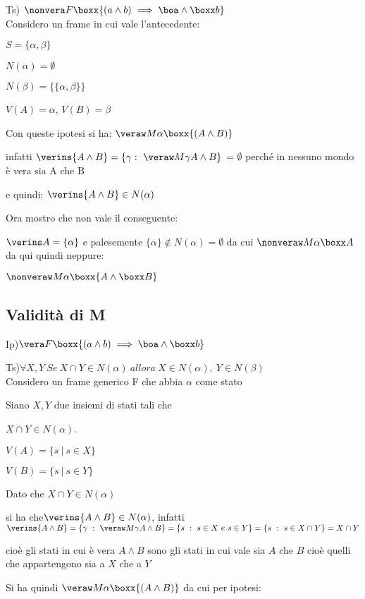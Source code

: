 Ts) $\nonvera F{\boxx{(a\wedge b)\implies\boa\wedge\boxx b}}$\\


Considero un frame in cui vale l'antecedente:

$S=\{\alpha,\beta\}$

$N(\alpha)=\emptyset$

$N(\beta)=\{\{\alpha,\beta\}\}$

$V(A)=\alpha$, $V(B)=\beta$

Con queste ipotesi si ha: $\veraw M{\alpha}{\boxx{(A\wedge B)}}$

infatti $\verins{A\wedge B}=\{\gamma:\ \mbox{\ensuremath{\veraw M{\gamma}{A\wedge B}}\}}$
= $\emptyset$ perché in nessuno mondo è vera sia A che B

e quindi:	$\verins{A\wedge B}\in N(\alpha)$ 

Ora mostro che non vale il conseguente:

$\verins A=\{\alpha\}$ e palesemente $\{\alpha\}\notin N(\alpha)=\emptyset$
da cui $\nonveraw M{\alpha}{\boxx A}$ da qui quindi neppure:

$\nonveraw M{\alpha}{\boxx{A\wedge\boxx B}}$


\subsection{Validità di M}

Ip)$\vera F{\boxx{(a\wedge b)\implies\boa\wedge\boxx b}}$ 

Ts)$\forall X,Y\ Se\ X\cap Y\in N(\alpha)\ allora\ X\in N(\alpha),\ Y\in N(\beta)$	\\
		

Considero un frame generico F che abbia $\alpha$ come stato

Siano $X,Y$ due insiemi di stati tali che

$X\cap Y\in N(\alpha)$. 

$V(A)=\{s\ |\ s\in X\}$

$V(B)=\{s\ |\ s\in Y\}$

Dato che $X\cap Y\in N(\alpha)$

si ha che$\verins{A\wedge B}\in N(\alpha)$, infatti $\verins{A\wedge B}=\{\gamma\ :\ \veraw M{\gamma}{A\wedge B\}}=\{s\ :\ s\in X\ e\ s\in Y\}=\{s\ :\ s\in X\cap Y\}=X\cap Y$

cioè gli stati in cui è vera $A\wedge B$ sono gli stati in cui vale
sia $A$ che $B$ cioè quelli che appartengono sia a $X$ che a $Y$

Si ha quindi $\veraw M{\alpha}{\boxx{(A\wedge B)}}$ da cui per ipotesi:


